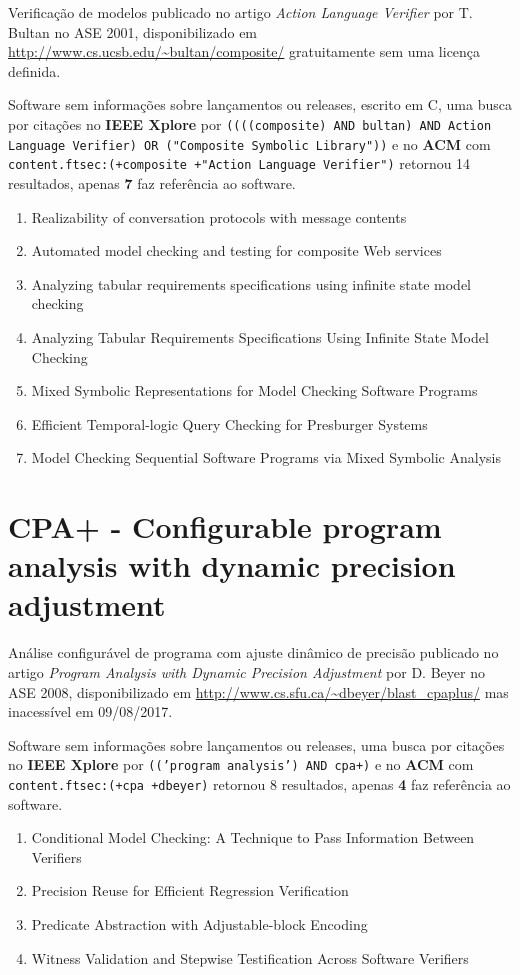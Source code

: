 Verificação de modelos
publicado no artigo {\it Action Language Verifier}
por T. Bultan
no ASE 2001,
disponibilizado em \url{http://www.cs.ucsb.edu/~bultan/composite/}
gratuitamente
sem uma licença definida.

Software sem informações sobre lançamentos ou releases,
escrito em C,
uma busca por citações no {\bf IEEE Xplore} por
\texttt{((((composite) AND bultan) AND Action Language Verifier) OR ("Composite Symbolic Library"))}
e no {\bf ACM} com
\texttt{content.ftsec:(+composite +"Action Language Verifier")}
retornou
14 resultados, apenas
{\bf 7} faz referência ao software.

\begin{enumerate}
\item Realizability of conversation protocols with message contents
\item Automated model checking and testing for composite Web services
\item Analyzing tabular requirements specifications using infinite state model checking
\item Analyzing Tabular Requirements Specifications Using Infinite State Model Checking
\item Mixed Symbolic Representations for Model Checking Software Programs
\item Efficient Temporal-logic Query Checking for Presburger Systems
\item Model Checking Sequential Software Programs via Mixed Symbolic Analysis
\end{enumerate}


\section{CPA+ - Configurable program analysis with dynamic precision adjustment}

Análise configurável de programa com ajuste dinâmico de precisão
publicado no artigo {\it Program Analysis with Dynamic Precision Adjustment}
por D. Beyer
no ASE 2008,
disponibilizado em \url{http://www.cs.sfu.ca/~dbeyer/blast_cpaplus/}
mas inacessível em 09/08/2017.

Software sem informações sobre lançamentos ou releases,
uma busca por citações no {\bf IEEE Xplore} por
\texttt{(('program analysis') AND cpa+)}
e no {\bf ACM} com
\texttt{content.ftsec:(+cpa +dbeyer)}
retornou
8 resultados, apenas
{\bf 4} faz referência ao software.

\begin{enumerate}
\item Conditional Model Checking: A Technique to Pass Information Between Verifiers
\item Precision Reuse for Efficient Regression Verification
\item Predicate Abstraction with Adjustable-block Encoding
\item Witness Validation and Stepwise Testification Across Software Verifiers
\end{enumerate}


